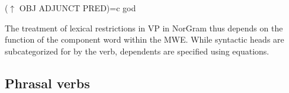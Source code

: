 \documentclass[output=paper]{langsci/langscibook}
\begin{document}
\ea\label{dyv:ex:mweiness:modrestriction}
{\small 
($\uparrow$ OBJ ADJUNCT PRED)=c god \\
}
\z

The treatment of lexical restrictions in VP  in NorGram thus depends on the function of the component word within the MWE. 
While syntactic heads are subcategorized for by the verb, dependents are specified using  equations.

  
\subsection{Phrasal verbs}\label{dyv:sec:mweiness:phrasal}
\end{document}
